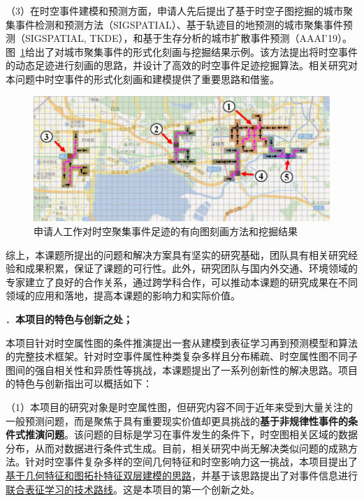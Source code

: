 \documentclass[12pt,UTF8,AutoFakeBold=2,a4paper]{ctexart} %
\newcommand{\sihao}{\fontsize{14pt}{\baselineskip}\selectfont}
\begin{document}
（3）在时空事件建模和预测方面，申请人先后提出了基于时空子图挖掘的城市聚集事件检测和预测方法（SIGSPATIAL）、基于轨迹目的地预测的城市聚集事件预测（SIGSPATIAL, TKDE），和基于生存分析的城市扩散事件预测（AAAI'19）。图~\ref{fig:event-big}给出了对城市聚集事件的形式化刻画与挖掘结果示例。该方法提出将时空事件的动态足迹进行刻画的思路，并设计了高效的时空事件足迹挖掘算法。相关研究对本问题中时空事件的形式化刻画和建模提供了重要思路和借鉴。
\begin{figure}[b!]
    \centering
    \includegraphics[width=0.9\linewidth]{fig/event_all5.png}
    \caption{申请人工作对时空聚集事件足迹的有向图刻画方法和挖掘结果}
    \label{fig:event-big}
\end{figure}

综上，本课题所提出的问题和解决方案具有坚实的研究基础，团队具有相关研究经验和成果积累，保证了课题的可行性。此外，研究团队与国内外交通、环境领域的专家建立了良好的合作关系，通过跨学科合作，可以推动本课题的研究成果在不同领域的应用和落地，提高本课题的影响力和实际价值。

\newpage
{\sihao \color{MsBlue} ．{\bfseries 本项目的特色与创新之处；}}

本项目针对时空属性图的条件推演提出一套从建模到表征学习再到预测模型和算法的完整技术框架。针对时空事件属性种类复杂多样且分布稀疏、时空属性图不同子图间的强自相关性和异质性等挑战，本课题提出了一系列创新性的解决思路。项目的特色与创新指出可以概括如下：

（1）本项目的研究对象是时空属性图，但研究内容不同于近年来受到大量关注的一般预测问题，而是聚焦于具有重要现实价值却更具挑战的\textbf{基于非规律性事件的条件式推演问题}。该问题的目标是学习在事件发生的条件下，时空图相关区域的数据分布，从而对数据进行条件式生成。目前，相关研究中尚无解决类似问题的成熟方法。针对时空事件复杂多样的空间几何特征和时空影响力这一挑战，本项目提出了\underline{基于几何特征和图拓扑特征双层建模的思路}，并基于该思路提出了对事件信息进行\underline{联合表征学习的技术路线}。这是本项目的第一个创新之处。

\end{document}
